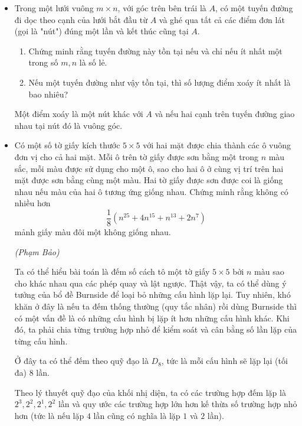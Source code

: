 \documentclass[11pt]{scrartcl}
\begin{document}
\begin{itemize}[label=, leftmargin=0em, itemsep=-0em]
    \item \begin{btvn} Trong một lưới vuông $m\times n$, với góc trên bên trái là $A$, có một tuyến đường đi dọc theo cạnh của lưới bắt đầu từ $A$ và ghé qua tất cả các điểm đơn lát (gọi là "nút") đúng một lần và kết thúc cũng tại $A$.
        \begin{enumerate}[label=(\alph*)]
            \item Chứng minh rằng tuyến đường này tồn tại nếu và chỉ nếu ít nhất một trong số $m, n$ là số lẻ.
            \item Nếu một tuyến đường như vậy tồn tại, thì số lượng điểm xoáy ít nhất là bao nhiêu?    
        \end{enumerate}
Một điểm xoáy là một nút khác với $A$ và nếu hai cạnh trên tuyến đường giao nhau tại nút đó là vuông góc.
    \end{btvn}

    \item \begin{btvn} 
    Có một số tờ giấy kích thước $5\times 5$ với hai mặt được chia thành các ô vuông đơn vị cho cả hai mặt. Mỗi ô trên tờ giấy được sơn bằng một trong $n$ màu sắc, mỗi màu được sử dụng cho một ô, sao cho hai ô ở cùng vị trí trên hai mặt được sơn bằng cùng một màu. Hai tờ giấy được sơn được coi là giống nhau nếu màu của hai ô tương ứng giống nhau. Chứng minh rằng không có nhiều hơn
    \[
        \frac{1}{8}\left(n^{25}+ 4n^{15} + n^{13} + 2n^7\right)
    \]
    mảnh giấy màu đôi một không giống nhau.
    \end{btvn}
        \begin{sol}\textit{(Phạm Bảo)}
            
            Ta có thể hiểu bài toán là đếm số cách tô một tờ giấy $5 \times 5$ bởi $n$ màu sao cho khác nhau qua các phép quay và lật ngược. Thật vậy, ta có thể dùng ý tưởng của bổ đề Burnside để loại bỏ những cấu hình lặp lại. Tuy nhiên, khó khăn ở đây là nếu ta đếm thống thường (quy tắc nhân) rồi dùng Burnside thì có một vấn đề là có những cấu hình bị lặp ít hơn những cấu hình khác. Khi đó, ta phải chia từng trường hợp nhỏ để kiểm soát và cân bằng số lần lặp của từng cấu hình.
            
            Ở đây ta có thể đếm theo quỹ đạo là $D_8$, tức là mỗi cấu hình sẽ lặp lại (tối đa) 8 lần.

            Theo lý thuyết quỹ đạo của khối nhị diện, ta có các trường hợp đếm lặp là $2^3,2^2,2^1,2^2$ lần và quy ước các trường hợp lớn hơn kế thừa số trường hợp nhỏ hơn (tức là nếu lặp $4$ lần cũng có nghĩa là lặp $1$ và $2$ lần).


\end{sol}
\end{itemize}
\end{document}
